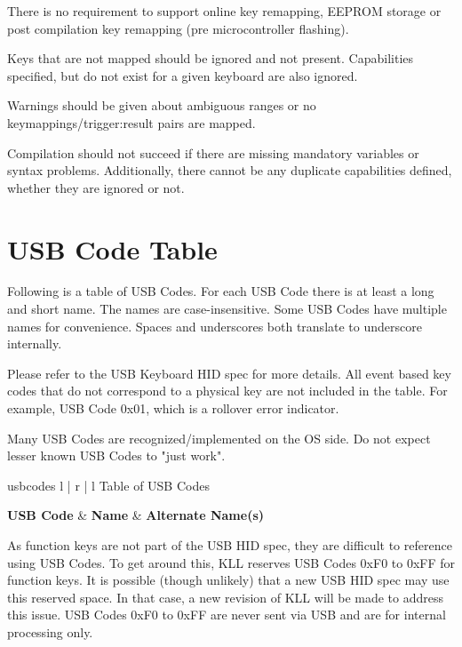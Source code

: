 \documentclass{kiibohd-template}
\begin{document}
There is no requirement to support online key remapping, EEPROM storage or post compilation key remapping (pre microcontroller flashing).

Keys that are not mapped should be ignored and not present.
Capabilities specified, but do not exist for a given keyboard are also ignored.

Warnings should be given about ambiguous ranges or no keymappings/trigger:result pairs are mapped.

Compilation should not succeed if there are missing mandatory variables or syntax problems.
Additionally, there cannot be any duplicate capabilities defined, whether they are ignored or not.


\newpage
\chapter{USB Code Table}
\label{chpt:USBCodeTable}

Following is a table of USB Codes.
For each USB Code there is at least a long and short name.
The names are case-insensitive.
Some USB Codes have multiple names for convenience.
Spaces and underscores both translate to underscore internally.

Please refer to the USB Keyboard HID spec for more details.
All event based key codes that do not correspond to a physical key are not included in the table.
For example, USB Code 0x01, which is a rollover error indicator.

Many USB Codes are recognized/implemented on the OS side.
Do not expect lesser known USB Codes to "just work".

\begin{ltable}{usbcodes}{ l | r | l }{Table of USB Codes}

\textbf{USB Code} & \textbf{Name} & \textbf{Alternate Name(s)} \\
\hline
\hline


\end{ltable}

As function keys are not part of the USB HID spec, they are difficult to reference using USB Codes.
To get around this, KLL reserves USB Codes 0xF0 to 0xFF for function keys.
It is possible (though unlikely) that a new USB HID spec may use this reserved space.
In that case, a new revision of KLL will be made to address this issue.
USB Codes 0xF0 to 0xFF are never sent via USB and are for internal processing only.
\end{document}

